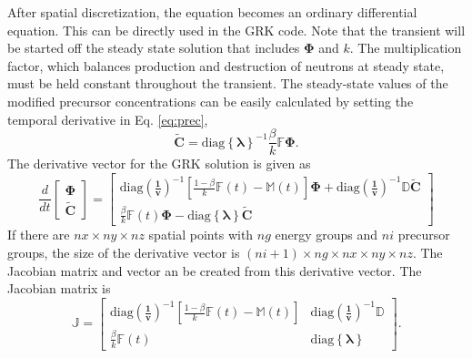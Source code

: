 \documentclass{ansconf}
\numberwithin{equation}{section}
\begin{document}
After spatial discretization, the equation becomes an ordinary differential equation. This can be directly used in the GRK code. Note that the transient will be started off the steady state solution that includes $\boldsymbol{\Phi}$ and $k$.  The multiplication factor, which balances production and destruction of neutrons at steady state, must be held constant throughout the transient. The steady-state values of the modified precursor concentrations can be easily calculated by setting the temporal derivative in Eq. \eqref{eq:prec},
\begin{equation}
    \widetilde{\boldsymbol{C}} = \mathrm{diag}\left\lbrace\boldsymbol{\lambda}\right\rbrace^{-1}\frac{\beta}{k}\mathbb{F}\boldsymbol{\Phi}.
\end{equation}
The derivative vector for the GRK solution is given as
\begin{equation}\label{eq:1D_deriv}
    \frac{d}{dt}\left[\begin{array}{c}
    \boldsymbol{\Phi} \\ \widetilde{\boldsymbol{C}} \end{array}\right] = 
    \left[\begin{array}{c}
    \mathrm{diag}\left(\boldsymbol{\frac{1}{v}}\right)^{-1}\left[\frac{1-\beta}{k}\mathbb{F}\left(t\right) - \mathbb{M}\left(t\right)\right]\boldsymbol{\Phi} + \mathrm{diag}\left(\boldsymbol{\frac{1}{v}}\right)^{-1}\mathbb{D}\widetilde{\boldsymbol{C}} \\
    \frac{\beta}{k}\mathbb{F}\left(t\right)\boldsymbol{\Phi} -  \mathrm{diag}\left\lbrace\boldsymbol{\lambda}\right\rbrace
    \widetilde{\boldsymbol{C}}
    \end{array}\right]
\end{equation}
If there are $nx\times ny\times nz$ spatial points with $ng$ energy groups and $ni$ precursor groups, the size of the derivative vector is $\left(ni+1\right)\times ng\times nx\times ny\times nz$. The Jacobian matrix and vector an be created from this derivative vector. The Jacobian matrix is
\begin{equation}
    \mathbb{J} = \left[ \begin{array}{cc} 
    \mathrm{diag}\left(\boldsymbol{\frac{1}{v}}\right)^{-1}\left[\frac{1-\beta}{k}\mathbb{F}\left(t\right) - \mathbb{M}\left(t\right)\right] & \mathrm{diag}\left(\boldsymbol{\frac{1}{v}}\right)^{-1}\mathbb{D} \\
     \frac{\beta}{k}\mathbb{F}\left(t\right) & \mathrm{diag}\left\lbrace\boldsymbol{\lambda}\right\rbrace
    \end{array}\right].
\end{equation}
\end{document}
